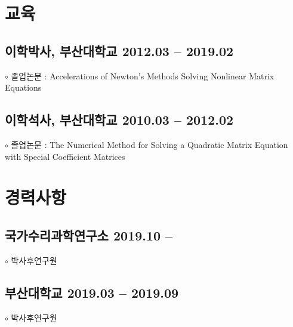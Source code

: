 \documentclass[11pt]{article} %
\begin{document}

\section*{교육}

\subsection*{이학박사, 부산대학교 \hfill 2012.03 -- 2019.02} %
$\circ$ 졸업논문 : Accelerations of Newton's Methods Solving Nonlinear Matrix Equations

\subsection*{이학석사, 부산대학교 \hfill 2010.03 -- 2012.02} %
$\circ$ 졸업논문 : The Numerical Method for Solving a Quadratic Matrix Equation with Special Coefficient Matrices


%


\section*{경력사항}
\subsection*{국가수리과학연구소 \hfill 2019.10 -- \phantom{0000.00}}
$\circ$ 박사후연구원
\subsection*{부산대학교 \hfill 2019.03 -- 2019.09}
$\circ$ 박사후연구원
\end{document}
